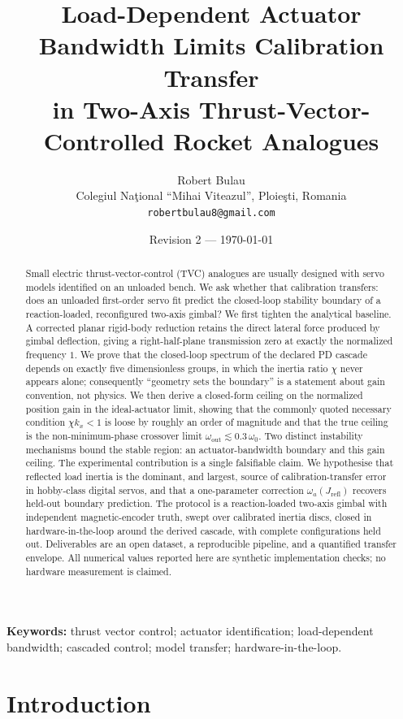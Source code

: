 \documentclass[11pt,a4paper]{article}
\title{Load-Dependent Actuator Bandwidth Limits Calibration Transfer\\
in Two-Axis Thrust-Vector-Controlled Rocket Analogues}
\author{Robert Bulau\\
\small Colegiul Na\c{t}ional ``Mihai Viteazul'', Ploie\c{s}ti, Romania\\
\small \texttt{robertbulau8@gmail.com}}
\date{Revision 2 --- \today}
\begin{document}
\maketitle

\begin{abstract}
Small electric thrust-vector-control (TVC) analogues are usually designed with servo models
identified on an unloaded bench. We ask whether that calibration transfers: does an unloaded
first-order servo fit predict the closed-loop stability boundary of a reaction-loaded, reconfigured
two-axis gimbal? We first tighten the analytical baseline. A corrected planar rigid-body reduction
retains the direct lateral force produced by gimbal deflection, giving a right-half-plane transmission
zero at exactly the normalized frequency $1$. We prove that the closed-loop spectrum of the declared
PD cascade depends on exactly five dimensionless groups, in which the inertia ratio $\chi$ never
appears alone; consequently ``geometry sets the boundary'' is a statement about gain convention, not
physics. We then derive a closed-form ceiling on the normalized position gain in the ideal-actuator
limit, showing that the commonly quoted necessary condition $\chi k_x<1$ is loose by roughly an order
of magnitude and that the true ceiling is the non-minimum-phase crossover limit
$\omega_{\text{out}}\lesssim 0.3\,\omega_0$. Two distinct instability mechanisms bound the stable
region: an actuator-bandwidth boundary and this gain ceiling. The experimental contribution is a
single falsifiable claim. We hypothesise that reflected load inertia is the dominant, and largest,
source of calibration-transfer error in hobby-class digital servos, and that a one-parameter
correction $\omega_a(J_{\text{refl}})$ recovers held-out boundary prediction. The protocol is a
reaction-loaded two-axis gimbal with independent magnetic-encoder truth, swept over calibrated
inertia discs, closed in hardware-in-the-loop around the derived cascade, with complete
configurations held out. Deliverables are an open dataset, a reproducible pipeline, and a quantified
transfer envelope. All numerical values reported here are synthetic implementation checks; no
hardware measurement is claimed.
\end{abstract}

\noindent\textbf{Keywords:} thrust vector control; actuator identification; load-dependent bandwidth;
cascaded control; model transfer; hardware-in-the-loop.

\section{Introduction}
\end{document}
